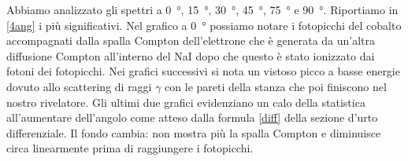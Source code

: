 Abbiamo analizzato gli spettri a \SI{0}{\degree}, \SI{15}{\degree}, \SI{30}{\degree}, \SI{45}{\degree}, \SI{75}{\degree} e \SI{90}{\degree}. Riportiamo in \autoref{4ang} i più significativi.
Nel grafico a \SI{0}{\degree} possiamo notare i fotopicchi del cobalto accompagnati dalla spalla Compton  dell'elettrone che è generata da un'altra diffusione Compton all'interno del NaI dopo che questo è stato ionizzato dai fotoni dei fotopicchi.
Nei grafici successivi si nota un vistoso picco a basse energie dovuto allo scattering di raggi $\gamma$ con le pareti della stanza che poi finiscono nel nostro rivelatore.
Gli ultimi due grafici evidenziano un calo della statistica all'aumentare dell'angolo come atteso dalla formula \autoref{diff} della sezione d'urto differenziale. Il fondo cambia: non mostra più la spalla Compton e diminuisce circa linearmente prima di raggiungere i fotopicchi.

